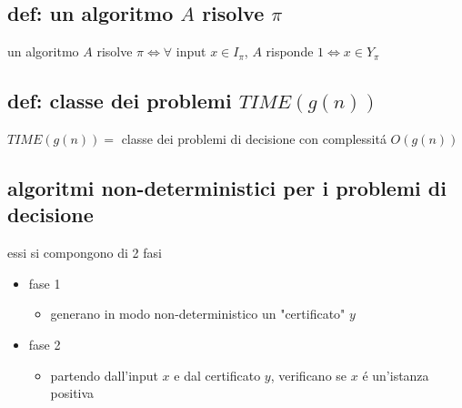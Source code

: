\subsection*{\color{cyan} def: un algoritmo $A$ risolve $\pi$}
\begin{flushleft}
	un algoritmo $A$ risolve $\pi\iff\forall$ input $x\in I_{\pi}$, $A$ risponde $1\iff x\in Y_{\pi}$
\end{flushleft}


\subsection*{\color{cyan} def: classe dei problemi $TIME(g(n))$}
\begin{flushleft}
	$TIME(g(n))=$ classe dei problemi di decisione con complessit\'a $O(g(n))$
\end{flushleft}


\subsection*{\color{cyan} algoritmi non-deterministici per i problemi di decisione}
\begin{flushleft}
	essi si compongono di 2 fasi
	\begin{itemize}
		\item fase 1
		\begin{itemize}
			\item generano in modo non-deterministico un "certificato" $y$
		\end{itemize}
		\item fase 2
		\begin{itemize}
			\item partendo dall'input $x$ e dal certificato $y$, verificano se $x$ \'e un'istanza positiva
		\end{itemize}
	\end{itemize}
\end{flushleft}


